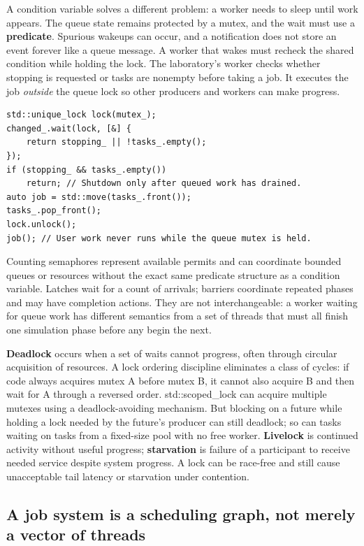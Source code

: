 A condition variable solves a different problem: a worker needs to sleep until work appears. The queue state remains protected by a mutex, and the wait must use a \textbf{predicate}. Spurious wakeups can occur, and a notification does not store an event forever like a queue message. A worker that wakes must recheck the shared condition while holding the lock. The laboratory's worker checks whether stopping is requested or tasks are nonempty before taking a job. It executes the job \emph{outside} the queue lock so other producers and workers can make progress.

\begin{verbatim}
std::unique_lock lock(mutex_);
changed_.wait(lock, [&] {
    return stopping_ || !tasks_.empty();
});
if (stopping_ && tasks_.empty())
    return; // Shutdown only after queued work has drained.
auto job = std::move(tasks_.front());
tasks_.pop_front();
lock.unlock();
job(); // User work never runs while the queue mutex is held.
\end{verbatim}

Counting semaphores represent available permits and can coordinate bounded queues or resources without the exact same predicate structure as a condition variable. Latches wait for a count of arrivals; barriers coordinate repeated phases and may have completion actions. They are not interchangeable: a worker waiting for queue work has different semantics from a set of threads that must all finish one simulation phase before any begin the next.

\textbf{Deadlock} occurs when a set of waits cannot progress, often through circular acquisition of resources. A lock ordering discipline eliminates a class of cycles: if code always acquires mutex A before mutex B, it cannot also acquire B and then wait for A through a reversed order. std::scoped\_lock can acquire multiple mutexes using a deadlock-avoiding mechanism. But blocking on a future while holding a lock needed by the future's producer can still deadlock; so can tasks waiting on tasks from a fixed-size pool with no free worker. \textbf{Livelock} is continued activity without useful progress; \textbf{starvation} is failure of a participant to receive needed service despite system progress. A lock can be race-free and still cause unacceptable tail latency or starvation under contention.

\subsection{A job system is a scheduling graph, not merely a vector of threads}\label{01-foundations-i-ch007-a-job-system-is-a-scheduling-graph-not-merely-a-vector-of-threads}

